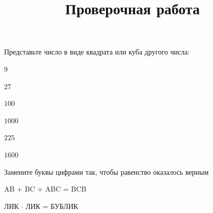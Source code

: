 \begin{listofex}
	\item Представьте число в виде квадрата или куба другого числа:
	\begin{enumcols}[itemcolumns=2]
		\item \( 9 \)
		\item \( 27 \)
		\item \( 100 \)
		\item \( 1000 \)
		\item \( 225 \)
		\item \( 1600 \)
	\end{enumcols}
	\item Замените буквы цифрами так, чтобы равенство оказалось верным
	\begin{enumcols}[itemcolumns=2]
		\item AB + BC + ABC = BCB
		\item ЛИК \( \cdot \) ЛИК = БУБЛИК
	\end{enumcols}
\end{listofex}
\newpage
\title{Проверочная работа}
